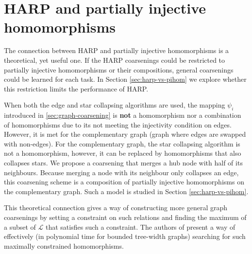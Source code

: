\section{HARP and partially injective homomorphisms}\label{sec:harp-as-pihom}

The connection between HARP and partially injective homomorphisms is a theoretical, yet useful one. If the HARP coarsenings could be restricted to partially injective homomorphisms or their compositions, general coarsenings could be learned for each task. In Section \ref{sec:harp-vs-pihom} we explore whether this restriction limits the performance of HARP.

When both the edge and star collapsing algorithms are used, the mapping \( \psi_i \) introduced in \ref{sec:graph-coarsening} is \textbf{not} a homomorphism nor a combination of homomorphisms due to its not meeting the injectivity condition on edges. However, it is met for the complementary graph (graph where edges are swapped with non-edges). For the complementary graph, the star collapsing algorithm is not a homomorphism, however, it can be replaced by homomorphisms that also collapses stars. We propose a coarsening that merges a hub node with half of its neighbours. Because merging a node with its neighbour only collapses an edge, this coarsening scheme is a composition of partially injective homomorphisms on the complementary graph. Such a model is studied in Section \ref{sec:harp-vs-pihom}.

This theoretical connection gives a way of constructing more general graph coarsenings by setting a constraint on such relations and finding the maximum of a subset of \( \mathcal{L} \) that satisfies such a constraint. The authors of \cite{schulz_mining_2019} present a way of effectively (in polynomial time for bounded tree-width graphs) searching for such maximally constrained homomorphisms.
